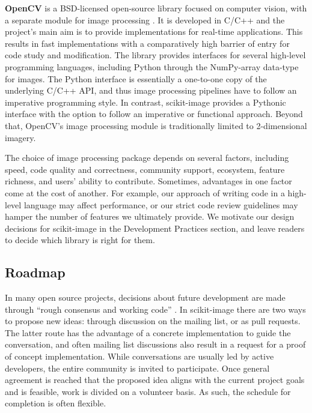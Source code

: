   \textbf{OpenCV} is a BSD-licensed open-source library focused on computer vision, with
  a separate module for image processing \citep{opencv}. It is
  developed in C/C++ and the project's main aim is to provide implementations for
  real-time applications. This results in fast implementations with a comparatively high
  barrier of entry for code study and modification. The library provides
  interfaces for several high-level programming languages, including Python
  through the NumPy-array data-type for images. The Python interface is
  essentially a one-to-one copy of the underlying C/C++ API, and thus image
  processing pipelines have to follow an imperative programming style. In
  contrast, scikit-image provides a Pythonic interface with the option
  to follow an imperative or functional approach. Beyond that, OpenCV's image
  processing module is traditionally limited to 2-dimensional imagery.

  The choice of image processing package depends on several factors, including
  speed, code quality and correctness, community support, ecosystem, feature
  richness, and users' ability to contribute. Sometimes, advantages in one
  factor come at the cost of another. For example, our approach of writing code
  in a high-level language may affect performance, or our strict code review
  guidelines may hamper the number of features we ultimately provide. We
  motivate our design decisions for scikit-image in the Development Practices
  section, and leave readers to decide which library is right for them.

  \subsection*{Roadmap}

  In many open source projects, decisions about future development are made
  through ``rough consensus and working code'' \citep{rfc2418}.  In scikit-image
  there are two ways to propose new ideas: through discussion on the mailing
  list, or as pull requests.  The latter route has the advantage of a concrete
  implementation to guide the conversation, and often mailing list discussions
  also result in a request for a proof of concept implementation.  While
  conversations are usually led by active developers, the entire community is
  invited to participate.  Once general agreement is reached that the proposed
  idea aligns with the current project goals and is feasible, work is divided
  on a volunteer basis.  As such, the schedule for completion is often
  flexible.

